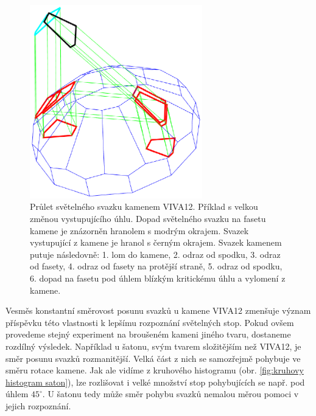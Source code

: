 \newpage
\begin{figure}[h!]
\begin{center}
\includegraphics[width = 7.5cm]{figures/odraz.eps}
\end{center}
\caption{Průlet světelného svazku kamenem VIVA12. Příklad s velkou změnou vystupujícího úhlu. Dopad světelného svazku na fasetu kamene je znázorněn hranolem s modrým okrajem. Svazek vystupující z kamene je hranol s černým okrajem. Svazek kamenem putuje následovně: 1. lom do kamene, 2. odraz od spodku, 3. odraz od fasety, 4. odraz od fasety na protější straně, 5. odraz od spodku, 6. dopad na fasetu pod úhlem blízkým kritickému úhlu a vylomení z kamene.}

\label{fig:odrazy v kamenu}
\end{figure}
\newpage

Vesměs konstantní směrovost posunu svazků u kamene VIVA12 zmenšuje význam příspěvku této vlastnosti k lepšímu rozpoznání světelných stop. Pokud ovšem provedeme stejný experiment na broušeném kameni jiného tvaru, dostaneme rozdílný výsledek. Například u šatonu, svým tvarem složitějším než VIVA12, je směr posunu svazků rozmanitější. Velká část z nich se samozřejmě pohybuje ve směru rotace kamene. Jak ale vidíme z kruhového histogramu (obr. \ref{fig:kruhovy histogram saton}), lze rozlišovat i velké množství stop pohybujících se např. pod úhlem $45^\circ$. U šatonu tedy může směr pohybu svazků nemalou měrou pomoci v jejich rozpoznání. 

